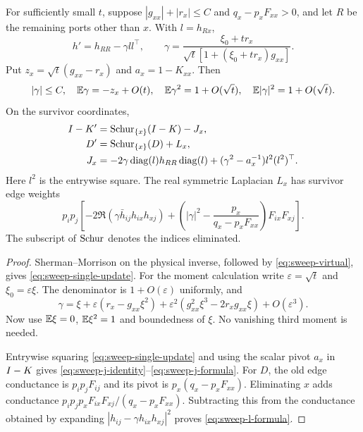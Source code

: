 \begin{lemma}\label{lem:single-update}
For sufficiently small $t$, suppose $|g_{xx}|+|r_x|\le C$ and
$q_x-p_xF_{xx}>0$, and let $R$ be the remaining ports
other than $x$. With $l=h_{Rx}$,
\begin{equation}\label{eq:sweep-single-update}
 h'=h_{RR}-\gamma ll^\top,\qquad
 \gamma=\frac{\xi_0+tr_x}{\sqrt t[1+(\xi_0+tr_x)g_{xx}]}.
\end{equation}
Put $z_x=\sqrt t(g_{xx}-r_x)$ and $a_x=1-K_{xx}$. Then
\begin{equation}\label{eq:sweep-gamma-moments}
 |\gamma|\le C,\quad
 \mathbb E\gamma=-z_x+O(t),\quad
 \mathbb E\gamma^2=1+O(\sqrt t),\quad
 \mathbb E|\gamma|^2=1+O(\sqrt t).
\end{equation}
On the survivor coordinates,
\begin{align}
 I-K'&=\operatorname{Schur}_{\{x\}}(I-K)-J_x,\label{eq:sweep-j-identity}\\
 D'&=\operatorname{Schur}_{\{x\}}(D)+L_x,\label{eq:sweep-l-identity}\\
 J_x&=-2\gamma\operatorname{diag}(l)h_{RR}\operatorname{diag}(l)
          +(\gamma^2-a_x^{-1})l^2(l^2)^\top.
          \label{eq:sweep-j-formula}
\end{align}
Here $l^2$ is the entrywise square. The real symmetric Laplacian
$L_x$ has survivor edge weights
\begin{equation}\label{eq:sweep-l-formula}
 p_ip_j\left[
 -2\Re(\gamma\bar h_{ij}h_{ix}h_{xj})
 +\left(|\gamma|^2-\frac{p_x}{q_x-p_xF_{xx}}\right)F_{ix}F_{xj}
 \right].
\end{equation}
The subscript of $\operatorname{Schur}$ denotes the indices eliminated.
\end{lemma}

\begin{proof}
Sherman--Morrison on the physical inverse, followed by
\eqref{eq:sweep-virtual}, gives \eqref{eq:sweep-single-update}.
For the moment calculation write $\varepsilon=\sqrt t$ and
$\xi_0=\varepsilon\xi$. The denominator is $1+O(\varepsilon)$ uniformly,
and
\[
 \gamma=\xi+\varepsilon(r_x-g_{xx}\xi^2)
       +\varepsilon^2(g_{xx}^2\xi^3-2r_xg_{xx}\xi)
       +O(\varepsilon^3).
\]
Now use $\mathbb E\xi=0$, $\mathbb E\xi^2=1$ and boundedness of $\xi$.
No vanishing third moment is needed.

Entrywise squaring \eqref{eq:sweep-single-update} and using the
scalar pivot $a_x$ in $I-K$ gives
\eqref{eq:sweep-j-identity}--\eqref{eq:sweep-j-formula}.
For $D$, the old edge conductance is $p_ip_jF_{ij}$ and its pivot
is $p_x(q_x-p_xF_{xx})$. Eliminating $x$ adds conductance
$p_ip_jp_xF_{ix}F_{xj}/(q_x-p_xF_{xx})$.
Subtracting this from the conductance obtained by expanding
$|h_{ij}-\gamma h_{ix}h_{xj}|^2$ proves
\eqref{eq:sweep-l-formula}.
\end{proof}

